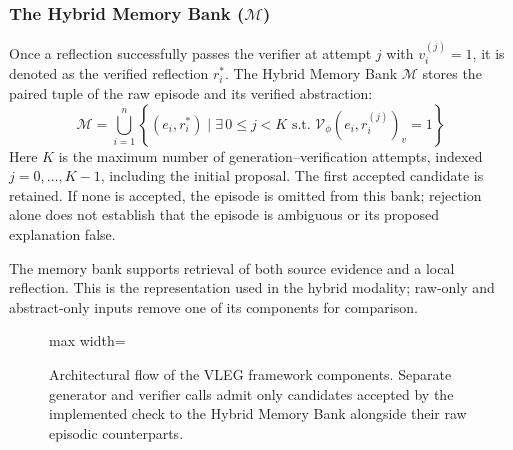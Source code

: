 \documentclass[journal]{IEEEtran}
\theoremstyle{definition}
\theoremstyle{remark}
\begin{document}
\subsubsection{The Hybrid Memory Bank (\texorpdfstring{$\mathcal{M}$}{M})}
Once a reflection successfully passes the verifier at attempt $j$ with $v_i^{(j)} = 1$, it is denoted as the verified reflection $r_i^*$. The Hybrid Memory Bank $\mathcal{M}$ stores the paired tuple of the raw episode and its verified abstraction:
\begin{equation}
    \mathcal{M} = \bigcup_{i=1}^{n} \left\{ (e_i, r_i^*) \mid \exists\,0\le j<K \text{ s.t. } \mathcal{V}_\phi(e_i, r_i^{(j)})_v = 1 \right\}
\end{equation}
Here $K$ is the maximum number of generation--verification attempts, indexed $j=0,\ldots,K-1$, including the initial proposal. The first accepted candidate is retained. If none is accepted, the episode is omitted from this bank; rejection alone does not establish that the episode is ambiguous or its proposed explanation false.

The memory bank supports retrieval of both source evidence and a local reflection. This is the representation used in the hybrid modality; raw-only and abstract-only inputs remove one of its components for comparison.

\begin{figure}[!t]
\centering
\begin{adjustbox}{max width=\linewidth}\end{adjustbox}
\caption{Architectural flow of the VLEG framework components. Separate generator and verifier calls admit only candidates accepted by the implemented check to the Hybrid Memory Bank alongside their raw episodic counterparts.}
\label{fig:vleg_components}
\end{figure}
\end{document}

